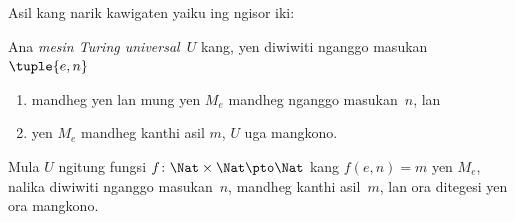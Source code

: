 \documentclass[../../../include/open-logic-section]{subfiles}
\begin{document}
Asil kang narik kawigaten yaiku ing ngisor iki:

\begin{thm} Ana \emph{mesin Turing
  universal}~$U$ kang, yen diwiwiti nganggo masukan $\tuple{e,n}$ 
  \begin{enumerate}
    \item mandheg yen lan mung yen $M_e$ mandheg nganggo masukan~$n$, lan
    \item yen $M_e$ mandheg kanthi asil $m$, $U$ uga mangkono.
  \end{enumerate}
  Mula $U$ ngitung fungsi $f\colon \Nat \times \Nat \pto \Nat$
  kang $f(e,n) = m$ yen $M_e$, nalika diwiwiti
  nganggo masukan~$n$, mandheg kanthi asil~$m$,
  lan ora ditegesi yen ora mangkono.
\end{thm}
\end{document}
